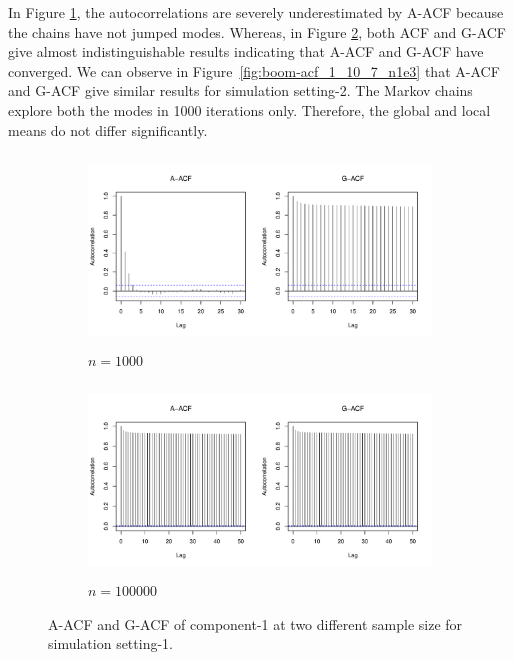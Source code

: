 \documentclass[11pt]{article}
\theoremstyle{remark}
\begin{document}
%
 In Figure \ref{subfig:boom-acf_1_3_8_n1e3}, the autocorrelations are severely underestimated by A-ACF because the chains have not jumped modes. Whereas, in Figure \ref{subfig:boom-acf_1_3_8_n1e5}, both ACF and G-ACF give almost indistinguishable results indicating that A-ACF and G-ACF have converged. We can observe in Figure~\ref{fig:boom-acf_1_10_7_n1e3} that A-ACF and G-ACF give similar results for simulation setting-2. The Markov chains explore both the modes in 1000 iterations only. Therefore, the global and local means do not differ significantly.\\
 
\begin{figure}[htbp]
    \centering
    \begin{subfigure}[h]{.8\textwidth}
      \centering
      \includegraphics[width = \textwidth, height = 2in]{plots/boom-acf_1_3_8_n1000.pdf}
      \caption{$n = 1000$}
      \label{subfig:boom-acf_1_3_8_n1e3}
    \end{subfigure}
    \begin{subfigure}[h]{.8\textwidth}
      \centering
      \includegraphics[width = \textwidth, height = 2in]{plots/boom-acf_n_1_3_8_n1e+05.pdf}
      \caption{$n = 100000$}
      \label{subfig:boom-acf_1_3_8_n1e5}
    \end{subfigure}
    \caption{A-ACF and G-ACF of component-1 at two different sample size for simulation setting-1.  }
    \label{fig:boom-acf}
\end{figure}
\end{document}

